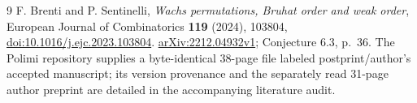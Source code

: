 \documentclass[11pt]{article}
\begin{document}
\begin{thebibliography}{9}
 F. Brenti and P. Sentinelli,
\emph{Wachs permutations, Bruhat order and weak order},
European Journal of Combinatorics \textbf{119} (2024), 103804,
\href{https://doi.org/10.1016/j.ejc.2023.103804}{doi:10.1016/j.ejc.2023.103804}.
\href{https://arxiv.org/abs/2212.04932}{arXiv:2212.04932v1};
Conjecture 6.3, p.~36. The Polimi repository supplies a byte-identical
38-page file labeled postprint/author's accepted manuscript;
its version provenance and the separately read 31-page author preprint
are detailed in the accompanying literature audit.
\end{thebibliography}
\end{document}
